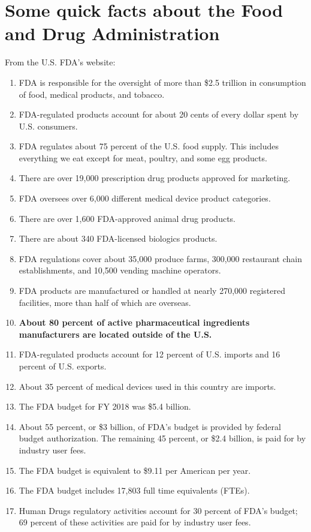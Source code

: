 \documentclass[11pt]{book}
\begin{document}
\section{Some quick facts about the Food and Drug Administration}
From the U.S. FDA's website:
\begin{enumerate}
	\item FDA is responsible for the oversight of more than \$2.5 trillion in consumption of food, medical products, and tobacco.
	\item FDA-regulated products account for about 20 cents of every dollar spent by U.S. consumers.
	\item FDA regulates about 75 percent of the U.S. food supply. This includes everything we eat except for meat, poultry, and some egg products.
	\item There are over 19,000 prescription drug products approved for marketing.
	\item FDA oversees over 6,000 different medical device product categories.
	\item There are over 1,600 FDA-approved animal drug products.
	\item There are about 340 FDA-licensed biologics products.
	\item FDA regulations cover about 35,000 produce farms, 300,000 restaurant chain establishments, and 10,500 vending machine operators.
	\item FDA products are manufactured or handled at nearly 270,000 registered facilities, more than half of which are overseas.
	\item \textbf{About 80 percent of active pharmaceutical ingredients manufacturers are located outside of the U.S.}
	\item FDA-regulated products account for 12 percent of U.S. imports and 16 percent of U.S. exports.
	\item About 35 percent of medical devices used in this country are imports.
	\item The FDA budget for FY 2018 was \$5.4 billion.
	\item About 55 percent, or \$3 billion, of FDA’s budget is provided by federal budget authorization. The remaining 45 percent, or \$2.4 billion, is paid for by industry user fees.
	\item The FDA budget is equivalent to \$9.11 per American per year.
	\item The FDA budget includes 17,803 full time equivalents (FTEs).
	\item Human Drugs regulatory activities account for 30 percent of FDA’s budget; 69 percent of these activities are paid for by industry user fees.

\end{enumerate}
\end{document}

